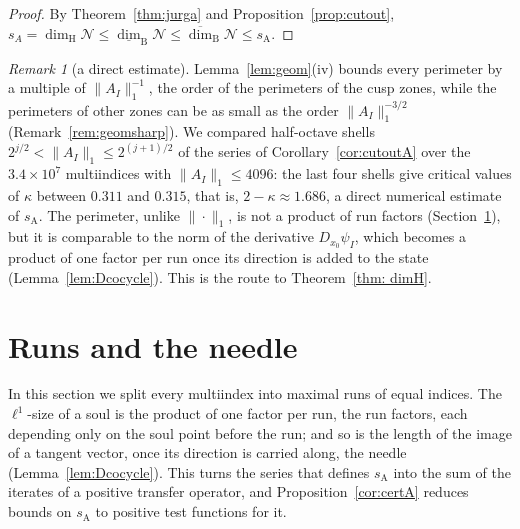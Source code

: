 \documentclass[11pt]{amsart}
\theoremstyle{definition}
\theoremstyle{remark}
\newtheorem{remark}[proposition]{Remark}
\newcommand{\cN}{\mathcal N}
\newcommand{\udimB}{\overline{\dim}_{\mathrm B}}
\newcommand{\sA}{s_{\mathrm A}}
\newcommand{\dimH}{\dim_{\mathrm H}}
\newcommand{\norm}[1]{\lVert #1\rVert}
\begin{document}
\begin{proof}
    By Theorem~\ref{thm:jurga} and Proposition~\ref{prop:cutout},
    $s_A=\dimH\cN\le\underline{\dim}_{\mathrm B}\cN\le\udimB\cN\le\sA$.
\end{proof}

\begin{remark}[a direct estimate]\label{rem:cutout}
Lemma~\ref{lem:geom}(iv) bounds every perimeter by a multiple of $\norm{A_I}_1^{-1}$, the order of the perimeters of the cusp zones, while the perimeters of other zones can be as small as the order $\norm{A_I}_1^{-3/2}$ (Remark~\ref{rem:geomsharp}).
We compared half-octave shells $2^{j/2}<\|A_I\|_1\le2^{(j+1)/2}$ of the series of Corollary~\ref{cor:cutoutA} over the $3.4\times10^7$ multiindices with $\|A_I\|_1\le4096$: the last four shells give critical values of $\kappa$ between $0.311$ and $0.315$, that is, $2-\kappa\approx1.686$, a direct numerical estimate of $\sA$. The perimeter, unlike $\|\cdot\|_1$, is not a product of run factors (Section~\ref{sec:cocycle}), but it is comparable to the norm of the derivative $D_{x_0}\psi_I$, which becomes a product of one factor per run once its direction is added to the state (Lemma~\ref{lem:Dcocycle}). This is the route to Theorem~\ref{thm: dimH}.
\end{remark}

\section{Runs and the needle}\label{sec:cocycle}

In this section we split every multiindex into maximal runs of equal indices. The $\ell^1$-size of a soul is the product of one factor per run, the run factors, each depending only on the soul point before the run; and so is the length of the image of a tangent vector, once its direction is carried along, the needle (Lemma~\ref{lem:Dcocycle}). This turns the series that defines $\sA$ into the sum of the iterates of a positive transfer operator, and Proposition~\ref{cor:certA} reduces bounds on $\sA$ to positive test functions for it.
\end{document}
